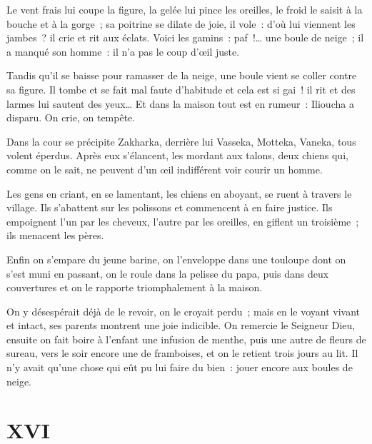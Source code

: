 \documentclass[french,twoside]{book} %
\begin{document}
Le vent frais lui coupe la figure, la gelée lui pince les oreilles, le froid le saisit à la bouche et à la gorge ; sa poitrine se dilate de joie, il vole : d’où lui viennent les jambes ? il crie et rit aux éclats. Voici les gamins : paf !… une boule de neige ; il a manqué son homme : il n’a pas le coup d’œil juste.\par
Tandis qu’il se baisse pour ramasser de la neige, une boule vient se coller contre sa figure. Il tombe et se fait mal faute d’habitude et cela est si gai ! il rit et des larmes lui sautent des yeux… Et dans la maison tout est en rumeur : Ilioucha a disparu. On crie, on tempête.\par
Dans la cour se précipite Zakharka, derrière lui Vasseka, Motteka, Vaneka, tous volent éperdus. Après eux s’élancent, les mordant aux talons, deux chiens qui, comme on le sait, ne peuvent d’un œil indifférent voir courir un homme.\par
Les gens en criant, en se lamentant, les chiens en aboyant, se ruent à travers le village. Ils s’abattent sur les polissons et commencent à en faire justice. Ils empoignent l’un par les cheveux, l’autre par les oreilles, en giflent un troisième ; ils menacent les pères.\par
Enfin on s’empare du jeune barine, on l’enveloppe dans une touloupe dont on s’est muni en passant, on le roule dans la pelisse du papa, puis dans deux couvertures et on le rapporte triomphalement à la maison.\par
On y désespérait déjà de le revoir, on le croyait perdu ; mais en le voyant vivant et intact, ses parents montrent une joie indicible. On remercie le Seigneur Dieu, ensuite on fait boire à l’enfant une infusion de menthe, puis une autre de fleurs de sureau, vers le soir encore une de framboises, et on le retient trois jours au lit. Il n’y avait qu’une chose qui eût pu lui faire du bien : jouer encore aux boules de neige.
\section[{XVI}]{XVI}\renewcommand{\leftmark}{XVI}
\end{document}
